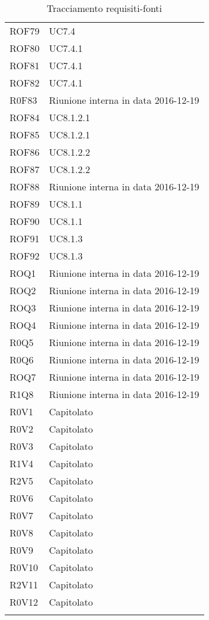 \documentclass[../AnalisiDeiRequisiti.tex]{subfiles}
\begin{document}
\begin{longtable}{p{4cm}!{\VRule[1pt]}p{4cm}}
ROF79 & UC7.4 \\
ROF80 & UC7.4.1 \\
ROF81 & UC7.4.1 \\
ROF82 & UC7.4.1 \\
R0F83 & Riunione interna in data 2016-12-19 \\
ROF84 & UC8.1.2.1 \\
ROF85 & UC8.1.2.1 \\
ROF86 & UC8.1.2.2 \\
ROF87 & UC8.1.2.2 \\
ROF88 & Riunione interna in data 2016-12-19 \\
ROF89 & UC8.1.1 \\
ROF90 & UC8.1.1 \\
ROF91 & UC8.1.3 \\
ROF92 & UC8.1.3 \\
ROQ1 & Riunione interna in data 2016-12-19 \\
ROQ2 & Riunione interna in data 2016-12-19 \\
ROQ3 & Riunione interna in data 2016-12-19 \\
ROQ4 & Riunione interna in data 2016-12-19 \\
R0Q5 & Riunione interna in data 2016-12-19 \\
R0Q6 & Riunione interna in data 2016-12-19 \\
ROQ7 & Riunione interna in data 2016-12-19 \\
R1Q8 & Riunione interna in data 2016-12-19 \\
R0V1 & Capitolato \\
R0V2 & Capitolato \\
R0V3 & Capitolato \\
R1V4 & Capitolato \\
R2V5 & Capitolato \\
R0V6 & Capitolato \\
R0V7 & Capitolato \\
R0V8 & Capitolato \\
R0V9 & Capitolato \\
R0V10 & Capitolato \\
R2V11 & Capitolato \\
R0V12 & Capitolato \\
\caption{Tracciamento requisiti-fonti}
\end{longtable}

\newpage
\end{document}
